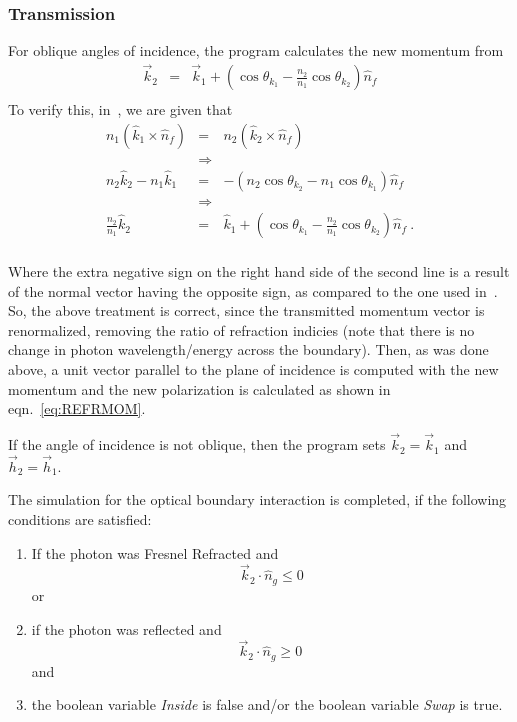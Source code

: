 \subsubsection{Transmission}

For oblique angles of incidence, the program calculates the new momentum from
\begin{eqnarray}
  \vec{k}_2 &=& \vec{k}_1 + \left(\cos\theta_{k_1} - \frac{n_2}{n_1}\cos\theta_{k_2}\right)\hat{n}_f \nonumber \\ \nonumber
\end{eqnarray}
To verify this, in~\cite{bb:HECHT}, we are given that 
\begin{eqnarray}
  n_1(\hat{k}_1 \times \hat{n}_f) &=& n_2(\hat{k}_2 \times \hat{n}_f) \nonumber \\ 
                                 &\Rightarrow& \nonumber \\
  n_2\hat{k}_2 - n_1\hat{k}_1     &=& -\left(n_2\cos\theta_{k_2} - n_1\cos\theta_{k_1}\right)\hat{n}_f \nonumber \\ 
                                 &\Rightarrow& \nonumber \\
  \frac{n_2}{n_1}\hat{k}_2  &=& \hat{k}_1 + \left(\cos\theta_{k_1} - \frac{n_2}{n_1}\cos\theta_{k_2}\right)\hat{n}_f~. \nonumber \\ \nonumber
\end{eqnarray}

Where the extra negative sign on the right hand side of the second
line is a result of the normal vector having the opposite sign, as
compared to the one used in~\cite{bb:HECHT}.  So, the above treatment
is correct, since the transmitted momentum vector is renormalized,
removing the ratio of refraction indicies (note that there is no
change in photon wavelength/energy across the boundary). Then, as was
done above, a unit vector parallel to the plane of incidence is
computed with the new momentum and the new polarization is calculated 
as shown in eqn.~\ref{eq:REFRMOM}.

If the angle of incidence is not oblique, then the program sets 
$\vec{k}_2 = \vec{k}_1$ and $\vec{h}_2 = \vec{h}_1$.

The simulation for the optical boundary interaction is completed, if
the following conditions are satisfied:

\begin{enumerate}
  \item{If the photon was Fresnel Refracted and \\
        $$\vec{k}_2\cdot\hat{n}_g \leq 0$$ or}
  \item{if the photon was reflected and \\
        $$\vec{k}_2\cdot\hat{n}_g \geq 0~$$ and}
  \item{the boolean variable {\em Inside} is false and/or the boolean variable
        {\em Swap} is true.}
\end{enumerate}

